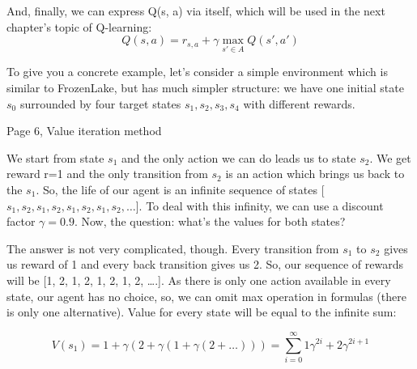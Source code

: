 And, finally, we can express Q(s, a) via itself, which will be used in the next chapter’s topic of Q-learning:
\begin{equation*}
Q(s,a)=r_{s,a} + \gamma \max_{s' \in A}Q(s',a')
\end{equation*}

To give you a concrete example, let’s consider a simple environment which is
similar to FrozenLake, but has much simpler structure: we have one initial state
\begin{math}s_0\end{math} surrounded by four target states \begin{math}s_1, s_2, s_3, s_4\end{math} with different rewards.

Page 6, Value iteration method

We start from state \begin{math}s_1\end{math} and the only action we can do leads us to state \begin{math}s_2\end{math}. We
get reward r=1 and the only transition from \begin{math}s_2\end{math} is an action which brings us back
to the \begin{math}s_1\end{math}. So, the life of our agent is an infinite sequence of states [
\begin{math}s_1, s_2, s_1, s_2, s_1, s_2, s_1, s_2,\ldots\end{math}]. To deal with this infinity, we can use a discount
factor \begin{math}\gamma=0.9\end{math}. Now, the question: what’s the values for both states?

The answer is not very complicated, though. Every transition from \begin{math}s_1\end{math} to \begin{math}s_2\end{math} gives
us reward of 1 and every back transition gives us 2. So, our sequence of rewards
will be [1, 2, 1, 2, 1, 2, 1, 2, ….]. As there is only one action available in
every state, our agent has no choice, so, we can omit max operation in formulas
(there is only one alternative). Value for every state will be equal to the
infinite sum:


\begin{equation*}
V(s_1) = 1 + \gamma (2 + \gamma(1 + \gamma(2 + \ldots))) = \sum_{i=0}^\infty 1\gamma^{2i}+2\gamma^{2i+1}
\end{equation*}


